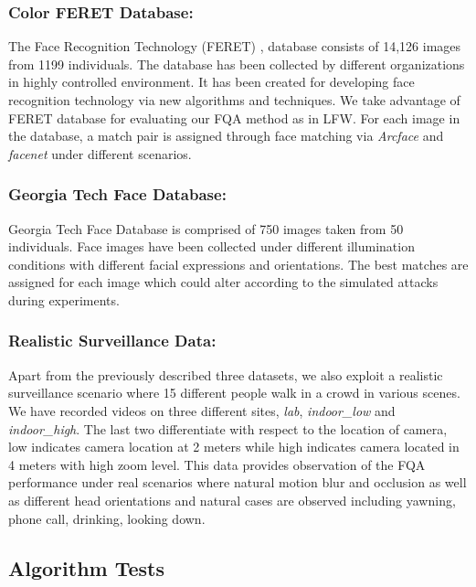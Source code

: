 \documentclass[runningheads]{llncs}
\begin{document}
\subsubsection{Color FERET Database:}

The Face Recognition Technology (FERET) \cite{FERET1998},\cite{FERET2000} database consists of 14,126 images from 1199 individuals. The database has been collected by different organizations in highly controlled environment. It has been created for developing face recognition technology via new algorithms and techniques. We take advantage of FERET database for evaluating our FQA method as in LFW. For each image in the database, a match pair is assigned through face matching via \textit{Arcface} and \textit{facenet} under different scenarios.

\subsubsection{Georgia Tech Face Database:}

Georgia Tech Face Database\cite{GeorgiaTech} is comprised of 750 images taken from 50 individuals. Face images have been collected under different illumination conditions with different facial expressions and orientations. The best matches are assigned for each image which could alter according to the simulated attacks during experiments.

\subsubsection{Realistic Surveillance Data:}

Apart from the previously described three datasets, we also exploit a realistic surveillance scenario where 15 different people walk in a crowd in various scenes. We have recorded videos on three different sites, \textit{lab}, \textit{indoor\_low} and \textit{indoor\_high}. The last two differentiate with respect to the location of camera, low indicates camera location at 2 meters while high indicates camera located in 4 meters with high zoom level. This data provides observation of the FQA performance under real scenarios where natural motion blur and occlusion as well as different head orientations and natural cases are observed including yawning, phone call, drinking, looking down. 

\subsection{Algorithm Tests}
\end{document}
